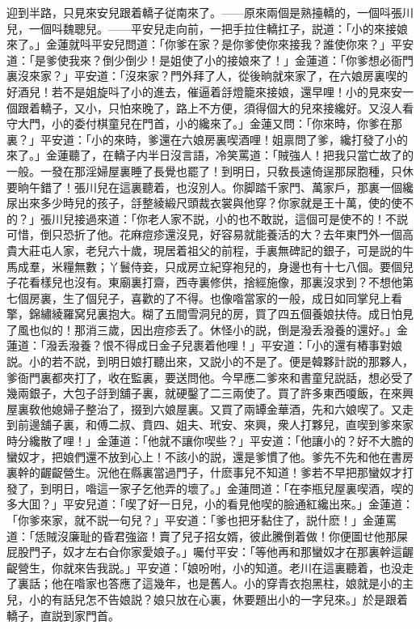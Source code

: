 迎到半路，只見來安兒跟着轎子従南來了。——原來兩個是熟擡轎的，一個呌張川兒，一個呌魏聰兒。——平安兒走向前，一把手拉住轎扛子，説道：「小的來接娘來了。」金蓮就呌平安兒問道：「你爹在家？是你爹使你來接我？誰使你來？」平安道：「是爹使我來？倒少倒少！是姐使了小的接娘來了！」金蓮道：「你爹想必衙門裏沒來家？」平安道：「沒來家？門外拜了人，從後晌就來家了，在六娘房裏喫的好酒兒！若不是姐旋呌了小的進去，催逼着㧱燈籠來接娘，還早哩！小的見來安一個跟着轎子，又小，只怕來晚了，路上不方便，須得個大的兒來接纔好。又沒人看守大門，小的委付棋童兒在門首，小的纔來了。」金蓮又問：「你來時，你爹在那裏？」平安道：「小的來時，爹還在六娘房裏喫酒哩！姐禀問了爹，纔打發了小的來了。」金蓮聽了，在轎子内半日沒言語，冷笑罵道：「賊強人！把我只當亡故了的一般。一發在那淫婦屋裏睡了長覺也罷了！到明日，只敎長遠倚逞那尿胞種，只休要晌午錯了！張川兒在這裏聽着，也沒別人。你脚踏千家門、萬家戶，那裏一個纔尿出來多少時兒的孩子，㧱整綾緞尺頭裁衣裳與他穿？你家就是王十萬，使的使不的？」張川兒接過來道：「你老人家不説，小的也不敢説，這個可是使不的！不説可惜，倒只恐折了他。花麻痘疹還沒見，好容易就能養活的大？去年東門外一個高貴大莊屯人家，老兒六十歲，現居着祖父的前程，手裏無碑記的銀子，可是説的牛馬成羣，米糧無數；丫鬟侍妾，只成房立紀穿袍兒的，身邊也有十七八個。要個兒子花看樣兒也沒有。東廟裏打齋，西寺裏修供，捨經施像，那裏沒求到？不想他第七個房裏，生了個兒子，喜歡的了不得。也像喒當家的一般，成日如同掌兒上看擎，錦繡綾羅窝兒裏抱大。糊了五間雪洞兒的房，買了四五個養娘扶侍。成日怕見了風也似的！那消三歲，因出痘疹丢了。休怪小的説，倒是潑丢潑養的還好。」金蓮道：「潑丢潑養？恨不得成日金子兒裹着他哩！」平安道：「小的還有樁事對娘説。小的若不説，到明日娘打聽出來，又説小的不是了。便是韓夥計説的那夥人，爹衙門裏都夾打了，收在監裏，要送問他。今早應二爹來和書童兒説話，想必受了幾兩銀子，大包子㧱到舖子裏，就硬鑿了二三兩使了。買了許多東西嗄飯，在來興屋裏敎他媳婦子整治了，掇到六娘屋裏。又買了兩罈金華酒，先和六娘喫了。又走到前邊舖子裏，和傅二叔、賁四、姐夫、玳安、來興，衆人打夥兒，直喫到爹來家時分纔散了哩！」金蓮道：「他就不讓你喫些？」平安道：「他讓小的？好不大膽的蠻奴才，把娘們還不放到心上！不該小的説，還是爹慣了他。爹先不先和他在書房裏幹的齷齪營生。況他在縣裏當過門子，什麽事兒不知道！爹若不早把那蠻奴才打發了，到明日，喒這一家子乞他弄的壞了。」金蓮問道：「在李瓶兒屋裏喫酒，喫的多大囬？」平安兒道：「喫了好一日兒，小的看見他喫的臉通紅纔出來。」金蓮道：「你爹來家，就不説一句兒？」平安道：「爹也把牙黏住了，説什麽！」金蓮罵道：「恁賊沒廉耻的昏君強盜！賣了兒子招女婿，彼此騰倒着做！你便圖せ他那屎屁股門子，奴才左右㒲你家愛娘子。」囑付平安：「等他再和那蠻奴才在那裏幹這齷齪營生，你就來告我説。」平安道：「娘吩咐，小的知道。老川在這裏聽着，也没走了裏話；他在喒家也答應了這幾年，也是舊人。小的穿青衣抱黑柱，娘就是小的主兒，小的有話兒怎不告娘説？娘只放在心裏，休要題出小的一字兒來。」於是跟着轎子，直説到家門首。

